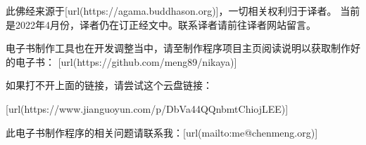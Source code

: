 此佛经来源于[url(https://agama.buddhason.org)]，一切相关权利归于译者。
当前是2022年4月份，译者仍在订正经文中。联系译者请前往译者网站留言。
\blank

电子书制作工具也在开发调整当中，请至制作程序项目主页阅读说明以获取制作好的电子书：
[url(https://github.com/meng89/nikaya)]

\blank
如果打不开上面的链接，请尝试这个云盘链接：

[url(https://www.jianguoyun.com/p/DbVa44QQnbmtChiojLEE)]

\blank
此电子书制作程序的相关问题请联系我：[url(mailto:me@chenmeng.org)]